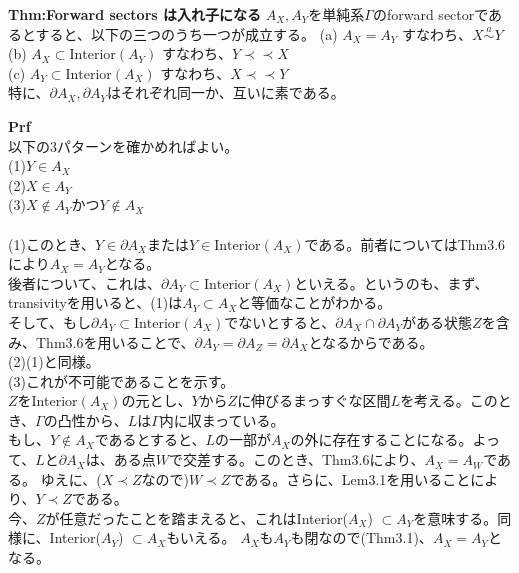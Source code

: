 \documentclass[a4paper,11pt]{jsarticle}
\numberwithin{equation}{section}
\begin{document}
\begin{itembox}[l]{\textbf{Thm:Forward sectors は入れ子になる}}
    $A_X,A_Y$を単純系$\Gamma$のforward sectorであるとすると、以下の三つのうち一つが成立する。
    (a) $A_X=A_Y$ すなわち、$X \overset{a}{\sim} Y$\\
    (b) $A_X \subset \text{Interior}(A_Y)$ すなわち、$Y \prec \prec X$\\
    (c) $A_Y \subset \text{Interior}(A_X)$ すなわち、$X \prec \prec Y$\\
    特に、$\partial A_X, \partial A_Y$はそれぞれ同一か、互いに素である。

\end{itembox}
\textbf{Prf}\\
以下の3パターンを確かめればよい。\\
(1)$Y \in A_X$\\
(2)$X \in A_Y$\\
(3)$X \notin A_Y$かつ$Y \notin A_X$\\
\\
(1)このとき、$Y \in \partial A_X$または$Y \in \text{Interior}(A_X)$である。前者についてはThm3.6により$A_X=A_Y$となる。\\
後者について、これは、$\partial A_Y \subset \text{Interior}(A_X)$といえる。というのも、まず、transivityを用いると、(1)は$A_Y \subset A_X$と等価なことがわかる。\\
そして、もし$\partial A_Y \subset \text{Interior}(A_X)$でないとすると、$\partial A_X \cap \partial A_Y$がある状態$Z$を含み、Thm3.6を用いることで、$\partial A_Y =\partial A_Z =\partial A_X $となるからである。\\
(2)(1)と同様。\\
(3)これが不可能であることを示す。\\
$Z$をInterior$(A_X)$の元とし、$Y$から$Z$に伸びるまっすぐな区間$L$を考える。このとき、$\Gamma$の凸性から、$L$は$\Gamma$内に収まっている。\\
もし、$Y \notin A_X$であるとすると、$L$の一部が$A_X$の外に存在することになる。よって、$L$と$\partial A_X$は、ある点$W$で交差する。このとき、Thm3.6により、$A_X=A_W$である。
ゆえに、($X \prec Z$なので)$W \prec Z$である。さらに、Lem3.1を用いることにより、$Y \prec Z$である。\\
今、$Z$が任意だったことを踏まえると、これはInterior($A_X$) $\subset A_Y$を意味する。同様に、Interior($A_Y$) $\subset A_X$もいえる。
$A_X$も$A_Y$も閉なので(Thm3.1)、$A_X =A_Y$となる。 \hfill \qedsymbol\\
\end{document}
